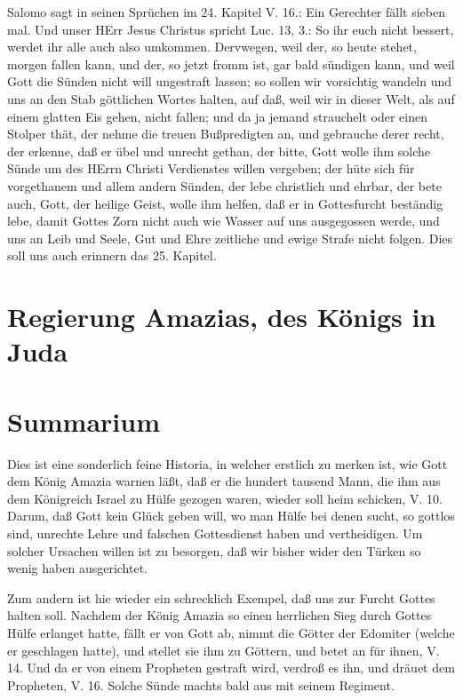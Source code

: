 Salomo sagt in seinen Sprüchen im 24. Kapitel V. 16.: Ein Gerechter fällt sieben mal. Und unser HErr Jesus Christus spricht Luc. 13, 3.: So ihr euch nicht bessert, werdet ihr alle auch also umkommen. Dervwegen, weil der, so heute stehet, morgen fallen kann, und der, so jetzt fromm ist, gar bald sündigen kann, und weil Gott die Sünden nicht will ungestraft lassen; so sollen wir vorsichtig wandeln und uns an den Stab göttlichen Wortes halten, auf daß, weil wir in dieser Welt, als auf einem glatten Eis gehen, nicht fallen; und da ja jemand strauchelt oder einen Stolper thät, der nehme die treuen Bußpredigten an, und gebrauche derer recht, der erkenne, daß er übel und unrecht gethan, der bitte, Gott wolle ihm solche Sünde um des HErrn Christi Verdienstes willen vergeben; der hüte sich für vorgethanem und allem andern Sünden, der lebe christlich und ehrbar, der bete auch, Gott, der heilige Geist, wolle ihm helfen, daß er in Gottesfurcht beständig lebe, damit Gottes Zorn nicht auch wie Wasser auf uns ausgegossen werde, und uns an Leib und Seele, Gut und Ehre zeitliche und ewige Strafe nicht folgen. Dies soll uns auch erinnern das 25. Kapitel.

\section[Regierung Amazias, des Königs in Juda]{Regierung Amazias, des Königs in Juda}

\section{Summarium}

Dies ist eine sonderlich feine Historia, in welcher erstlich zu merken ist, wie Gott dem König Amazia warnen läßt, daß er die hundert tausend Mann, die ihm aus dem Königreich Israel zu Hülfe gezogen waren, wieder soll heim schicken, V. 10. Darum, daß Gott kein Glück geben will, wo man Hülfe bei denen sucht, so gottlos sind, unrechte Lehre und falschen Gottesdienst haben und vertheidigen. Um solcher Ursachen willen ist zu besorgen, daß wir bisher wider den Türken so wenig haben ausgerichtet.

Zum andern ist hie wieder ein schrecklich Exempel, daß uns zur Furcht Gottes halten soll. Nachdem der König Amazia so einen herrlichen Sieg durch Gottes Hülfe erlanget hatte, fällt er von Gott ab, nimmt die Götter der Edomiter (welche er geschlagen hatte), und stellet sie ihm zu Göttern, und betet an für ihnen, V. 14. Und da er von einem Propheten gestraft wird, verdroß es ihn, und dräuet dem Propheten, V. 16. Solche Sünde machts bald aus mit seinem Regiment.


